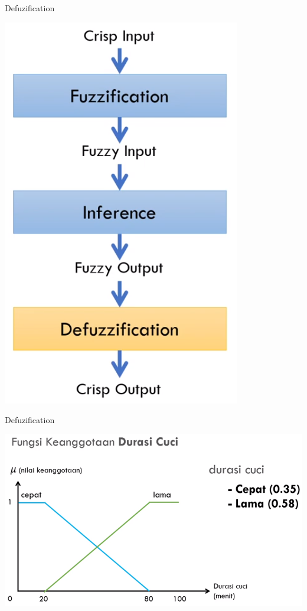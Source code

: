 \documentclass[pdflatex,compress,mathserif]{beamer}
\begin{document}
\begin{frame}{Defuzification}
	\begin{center}
		\includegraphics[height=0.8\textheight]{img/defuzzification}
	\end{center}
\end{frame}

\begin{frame}{Defuzification}
	\begin{center}
		\includegraphics[height=0.8\textheight]{img/38}
	\end{center}
\end{frame}
\end{document}
